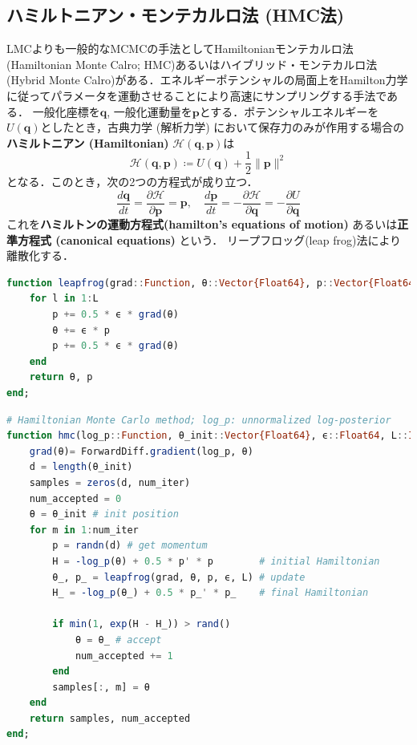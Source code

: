 \subsection{ハミルトニアン・モンテカルロ法 (HMC法)}
LMCよりも一般的なMCMCの手法としてHamiltonianモンテカルロ法(Hamiltonian Monte Calro; HMC)あるいはハイブリッド・モンテカルロ法(Hybrid Monte Calro)がある．エネルギーポテンシャルの局面上をHamilton力学に従ってパラメータを運動させることにより高速にサンプリングする手法である．
一般化座標を$\mathbf{q}$, 一般化運動量を$\mathbf{p}$とする．ポテンシャルエネルギーを$U(\mathbf{q})$としたとき，古典力学 (解析力学) において保存力のみが作用する場合の\textbf{ハミルトニアン (Hamiltonian)} $\mathcal{H}(\mathbf{q}, \mathbf{p})$は
\begin{equation}
\mathcal{H}(\mathbf{q}, \mathbf{p})\coloneqq U(\mathbf{q})+\frac{1}{2}\|\mathbf{p}\|^2
\end{equation}
となる．このとき，次の2つの方程式が成り立つ．
\begin{equation}
\frac{d\mathbf{q}}{dt}=\frac{\partial \mathcal{H}}{\partial \mathbf{p}}=\mathbf{p},\quad\frac{d\mathbf{p}}{dt}=-\frac{\partial \mathcal{H}}{\partial \mathbf{q}}=-\frac{\partial U}{\partial \mathbf{q}}
\end{equation}
これを\textbf{ハミルトンの運動方程式(hamilton's equations of motion)} あるいは\textbf{正準方程式 (canonical equations)} という．
リープフロッグ(leap frog)法により離散化する．
\begin{lstlisting}[language=julia]
function leapfrog(grad::Function, θ::Vector{Float64}, p::Vector{Float64}, ϵ::Float64, L::Int)
    for l in 1:L
        p += 0.5 * ϵ * grad(θ)
        θ += ϵ * p
        p += 0.5 * ϵ * grad(θ)
    end
    return θ, p
end;
\end{lstlisting}
\begin{lstlisting}[language=julia]
# Hamiltonian Monte Carlo method; log_p: unnormalized log-posterior
function hmc(log_p::Function, θ_init::Vector{Float64}, ϵ::Float64, L::Int, num_iter::Int)
    grad(θ)= ForwardDiff.gradient(log_p, θ)
    d = length(θ_init)
    samples = zeros(d, num_iter)
    num_accepted = 0
    θ = θ_init # init position
    for m in 1:num_iter
        p = randn(d) # get momentum        
        H = -log_p(θ) + 0.5 * p' * p        # initial Hamiltonian
        θ_, p_ = leapfrog(grad, θ, p, ϵ, L) # update
        H_ = -log_p(θ_) + 0.5 * p_' * p_    # final Hamiltonian
        
        if min(1, exp(H - H_)) > rand()
            θ = θ_ # accept
            num_accepted += 1
        end
        samples[:, m] = θ
    end
    return samples, num_accepted
end;
\end{lstlisting}
